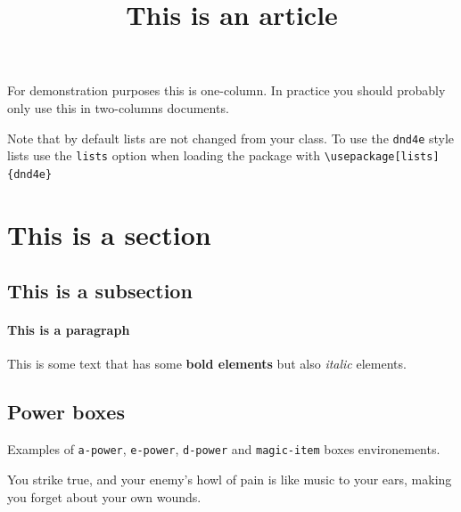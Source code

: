 \documentclass{article}
\title{This is an article}
\begin{document}
\maketitle

For demonstration purposes this is one-column. In practice you should probably only use this in two-columns documents.

Note that by default lists are not changed from your class. To use the \texttt{dnd4e} style lists use the \texttt{lists} option when loading the package with \texttt{\textbackslash usepackage[lists]\{dnd4e\}}

\section{This is a section}

\subsection{This is a subsection}

\paragraph{This is a paragraph} This is some text that has some \textbf{bold elements} but also \textit{italic} elements.

\subsection{Power boxes}

Examples of \texttt{a-power}, \texttt{e-power}, \texttt{d-power} and
\texttt{magic-item} boxes environements.

\begin{a-power}{}

	\begin{flavor}
		You strike true, and your enemy’s howl of pain is like music to your ears,
		making you forget about your own wounds.
	\end{flavor}


	\begin{beigeline}

	\end{beigeline}

\end{a-power}
\end{document}

